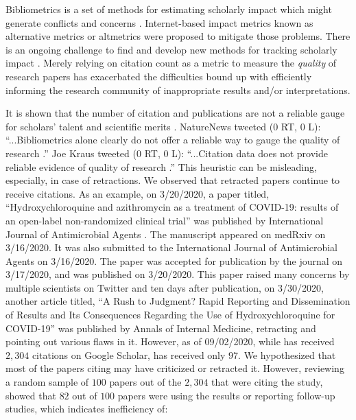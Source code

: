 \documentclass[acmsmall,authordraft]{acmart}
\begin{document}
Bibliometrics is a set of methods for estimating scholarly impact which might generate conflicts and concerns \cite{roemer2012bibliometrics}. Internet-based impact metrics known as alternative metrics or altmetrics were proposed to mitigate those problems. 
There is an ongoing challenge to find and develop new methods for tracking scholarly impact \cite{roemer2012bibliometrics}. Merely relying on citation count as a metric to measure the \textit{quality} of research papers has exacerbated the difficulties bound up with efficiently informing the research community of inappropriate results and/or interpretations.

It is shown that the number of citation and publications are not a reliable gauge for scholars' talent and scientific merits \citep{ruocco2017bibliometric}. NatureNews tweeted ($0$ RT, $0$ L): ``...Bibliometrics alone clearly do not offer a reliable way to gauge the quality of research \citep{Nature2010twitter}.'' Joe Kraus tweeted ($0$ RT, $0$ L): ``...Citation data does not provide reliable evidence of quality of research \citep{Kraus2013twitter}.''
This heuristic can be misleading, especially, in case of retractions. We observed that retracted papers continue to receive citations. As an example, on 3/20/2020, a paper titled, ``Hydroxychloroquine and azithromycin as a treatment of COVID-19: results of an open-label non-randomized clinical trial'' was published by International Journal of Antimicrobial Agents \citep{gautret2020hydroxychloroquine}. The manuscript appeared on medRxiv on 3/16/2020. It was also submitted to the International Journal of Antimicrobial Agents on 3/16/2020. The paper was accepted for publication by the journal on 3/17/2020, and was published on 3/20/2020. This paper raised many concerns by multiple scientists on Twitter and ten days after publication, on 3/30/2020, another article titled, ``A Rush to Judgment? Rapid Reporting and Dissemination of Results and Its Consequences Regarding the Use of Hydroxychloroquine for COVID-19'' \citep{kim2020rush} was published by Annals of Internal Medicine, retracting \citet{gautret2020hydroxychloroquine} and pointing out various flaws in it. However, as of 09/02/2020, while \citet{gautret2020hydroxychloroquine} has received $2,304$ citations on Google Scholar, \citet{kim2020rush} has received only $97$. We hypothesized that most of the papers citing \citet{gautret2020hydroxychloroquine} may have criticized or retracted it. However, reviewing a random sample of $100$ papers out of the $2,304$ that were citing the study, showed that $82$ out of $100$ papers were using the results or reporting follow-up studies, which indicates inefficiency of:
\end{document}
